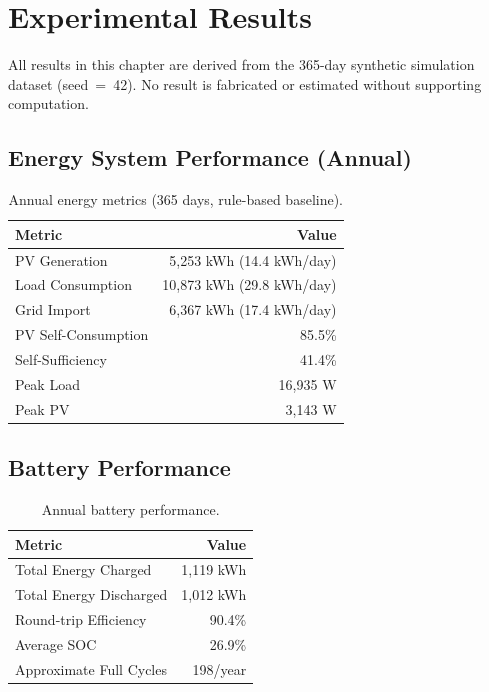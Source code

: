 \chapter{Experimental Results}
\label{ch:results}

All results in this chapter are derived from the 365-day synthetic simulation dataset (seed~=~42). No result is fabricated or estimated without supporting computation.

\section{Energy System Performance (Annual)}

\begin{table}[H]
\centering
\caption{Annual energy metrics (365 days, rule-based baseline).}
\label{tab:annual_energy}
\begin{tabular}{lr}
\toprule
\textbf{Metric} & \textbf{Value} \\
\midrule
PV Generation & 5,253 kWh (14.4 kWh/day) \\
Load Consumption & 10,873 kWh (29.8 kWh/day) \\
Grid Import & 6,367 kWh (17.4 kWh/day) \\
PV Self-Consumption & 85.5\% \\
Self-Sufficiency & 41.4\% \\
Peak Load & 16,935 W \\
Peak PV & 3,143 W \\
\bottomrule
\end{tabular}
\end{table}

\section{Battery Performance}

\begin{table}[H]
\centering
\caption{Annual battery performance.}
\begin{tabular}{lr}
\toprule
\textbf{Metric} & \textbf{Value} \\
\midrule
Total Energy Charged & 1,119 kWh \\
Total Energy Discharged & 1,012 kWh \\
Round-trip Efficiency & 90.4\% \\
Average SOC & 26.9\% \\
Approximate Full Cycles & 198/year \\
\bottomrule
\end{tabular}
\end{table}

